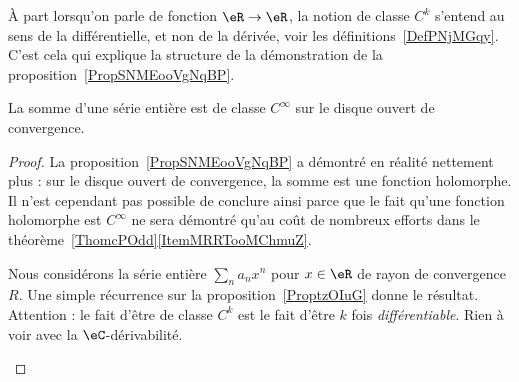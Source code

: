 \begin{remark}
	À part lorsqu'on parle de fonction \( \eR\to \eR\), la notion de classe \( C^k\) s'entend au sens de la différentielle, et non de la dérivée, voir les définitions~\ref{DefPNjMGqy}. C'est cela qui explique la structure de la démonstration de la proposition~\ref{PropSNMEooVgNqBP}.
\end{remark}

\begin{corollary}       \label{CorCBYHooQhgara}
	La somme d'une série entière est de classe \( C^{\infty}\) sur le disque ouvert de convergence.
\end{corollary}

\begin{proof}
	La proposition~\ref{PropSNMEooVgNqBP} a démontré en réalité nettement plus : sur le disque ouvert de convergence, la somme est une fonction holomorphe. Il n'est cependant pas possible de conclure ainsi parce que le fait qu'une fonction holomorphe est \( C^{\infty}\) ne sera démontré qu'au coût de nombreux efforts dans le théorème~\ref{ThomcPOdd}\ref{ItemMRRTooMChmuZ}.

	\begin{subproof}
		Nous considérons la série entière \( \sum_na_nx^n\) pour \( x\in \eR\) de rayon de convergence \( R\). Une simple récurrence sur la proposition~\ref{ProptzOIuG} donne le résultat.
		Attention : le fait d'être de classe \( C^k\) est le fait d'être \( k\) fois \emph{différentiable}. Rien à voir avec la \( \eC\)-dérivabilité.


\end{subproof}
\end{proof}
